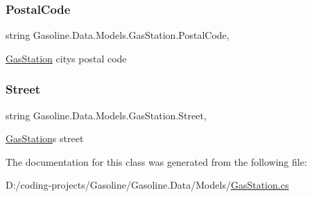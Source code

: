 \mbox{\label{class_gasoline_1_1_data_1_1_models_1_1_gas_station_ae7821db2743b82b2e9637a27fdf32260}} 
\subsubsection{\texorpdfstring{PostalCode}{PostalCode}}
{\footnotesize\ttfamily string Gasoline.\+Data.\+Models.\+Gas\+Station.\+Postal\+Code\hspace{0.3cm}{\ttfamily [get]}, {\ttfamily [set]}}



\mbox{\hyperlink{class_gasoline_1_1_data_1_1_models_1_1_gas_station}{Gas\+Station}} city\textquotesingle{}s postal code 

\mbox{\label{class_gasoline_1_1_data_1_1_models_1_1_gas_station_a5921248ca0bc7059f3e95589d94e2472}} 
\subsubsection{\texorpdfstring{Street}{Street}}
{\footnotesize\ttfamily string Gasoline.\+Data.\+Models.\+Gas\+Station.\+Street\hspace{0.3cm}{\ttfamily [get]}, {\ttfamily [set]}}



\mbox{\hyperlink{class_gasoline_1_1_data_1_1_models_1_1_gas_station}{Gas\+Station}}\textquotesingle{}s street 



The documentation for this class was generated from the following file\+:\begin{DoxyCompactItemize}
\item 
D\+:/coding-\/projects/\+Gasoline/\+Gasoline.\+Data/\+Models/\mbox{\hyperlink{_gas_station_8cs}{Gas\+Station.\+cs}}\end{DoxyCompactItemize}
